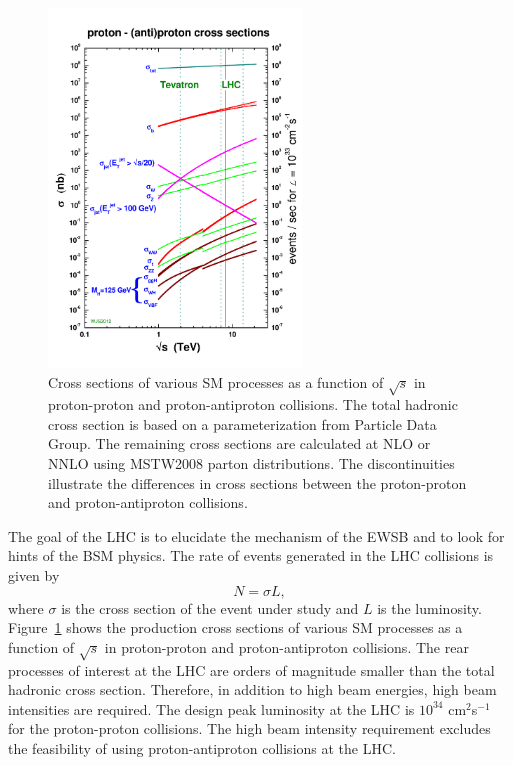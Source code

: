 \begin{figure}[h]
\centering
\includegraphics[width=0.6\textwidth]{figures_chapter2/crosssections2013}
\caption{Cross sections of various SM processes as a function of $\sqrt{s}$ in proton-proton and proton-antiproton collisions\cite{sterling}. The total hadronic cross section is based on a parameterization from Particle Data Group\cite{Agashe:2014kda}. The remaining cross sections are calculated at NLO or NNLO using MSTW2008 parton distributions\cite{MSTW}. The discontinuities illustrate the differences in cross sections between the proton-proton and proton-antiproton collisions.}
\label{fig:xsec}
\end{figure}

The goal of the LHC is to elucidate the mechanism of the EWSB and to look for hints of the BSM physics. The rate of events generated in the LHC collisions is given by 
\begin{equation} \label{eq:lumi}
N = \sigma L,
\end{equation}
where $\sigma$ is the cross section of the event under study and $L$ is the luminosity. Figure~\ref{fig:xsec} shows the production cross sections of various SM processes as a function of $\sqrt{s}$ in proton-proton and proton-antiproton collisions. The rear processes of interest at the LHC are orders of magnitude smaller than the total hadronic cross section. Therefore, in addition to high beam energies, high beam intensities are required. The design peak luminosity at the LHC is $10^{34}$ cm$^2$s$^{-1}$ for the proton-proton collisions. The high beam intensity requirement excludes the feasibility of using proton-antiproton collisions at the LHC. 


